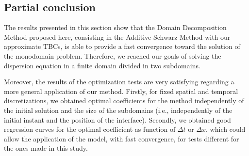 \subsection{Partial conclusion}
 
\indent The results presented in this section show that the Domain Decomposition Method proposed here, consisting in the Additive Schwarz Method with our approximate TBCs, is able to provide a fast convergence toward the solution of the monodomain problem. Therefore, we reached our goals of solving the dispersion equation in a finite domain divided in two subdomains.

\indent Moreover, the results of the optimization tests are very satisfying regarding a more general application of our method. Firstly, for fixed spatial and temporal discretizations, we obtained optimal coefficients for the method independently of the initial solution and the size of the subdomains (i.e., independently of the initial instant and the position of the interface). Secondly, we obtained good regression curves for the optimal coefficient as function of $\Delta t$ or $\Delta x$, which could allow the application of the model, with fast convergence, for tests different for the ones made in this study.
